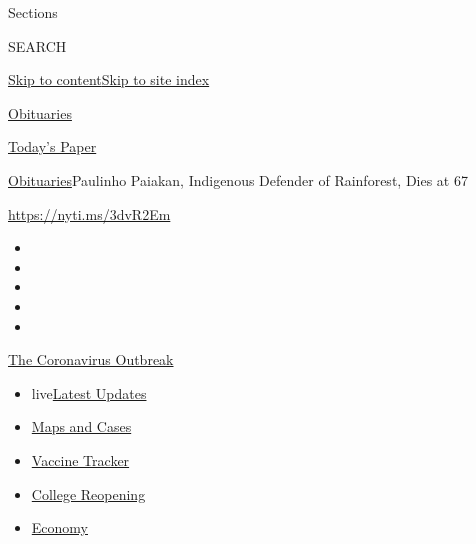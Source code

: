 Sections

SEARCH

\protect\hyperlink{site-content}{Skip to
content}\protect\hyperlink{site-index}{Skip to site index}

\href{https://www.nytimes3xbfgragh.onion/section/obituaries}{Obituaries}

\href{https://myaccount.nytimes3xbfgragh.onion/auth/login?response_type=cookie\&client_id=vi}{}

\href{https://www.nytimes3xbfgragh.onion/section/todayspaper}{Today's
Paper}

\href{/section/obituaries}{Obituaries}\textbar{}Paulinho Paiakan,
Indigenous Defender of Rainforest, Dies at 67

\url{https://nyti.ms/3dvR2Em}

\begin{itemize}
\item
\item
\item
\item
\item
\end{itemize}

\href{https://www.nytimes3xbfgragh.onion/news-event/coronavirus?action=click\&pgtype=Article\&state=default\&region=TOP_BANNER\&context=storylines_menu}{The
Coronavirus Outbreak}

\begin{itemize}
\tightlist
\item
  live\href{https://www.nytimes3xbfgragh.onion/2020/08/04/world/coronavirus-covid-19.html?action=click\&pgtype=Article\&state=default\&region=TOP_BANNER\&context=storylines_menu}{Latest
  Updates}
\item
  \href{https://www.nytimes3xbfgragh.onion/interactive/2020/us/coronavirus-us-cases.html?action=click\&pgtype=Article\&state=default\&region=TOP_BANNER\&context=storylines_menu}{Maps
  and Cases}
\item
  \href{https://www.nytimes3xbfgragh.onion/interactive/2020/science/coronavirus-vaccine-tracker.html?action=click\&pgtype=Article\&state=default\&region=TOP_BANNER\&context=storylines_menu}{Vaccine
  Tracker}
\item
  \href{https://www.nytimes3xbfgragh.onion/2020/08/02/us/covid-college-reopening.html?action=click\&pgtype=Article\&state=default\&region=TOP_BANNER\&context=storylines_menu}{College
  Reopening}
\item
  \href{https://www.nytimes3xbfgragh.onion/live/2020/08/03/business/stock-market-today-coronavirus?action=click\&pgtype=Article\&state=default\&region=TOP_BANNER\&context=storylines_menu}{Economy}
\end{itemize}

